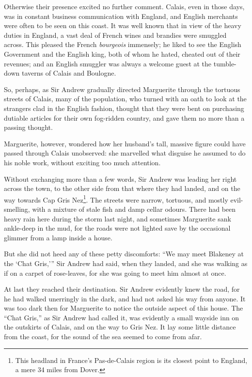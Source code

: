 \documentclass[paper=a5,BCOR=7mm,twoside,DIV=calc,12pt,usegeometry,chapterprefix,endperiod,headings=big]{scrbook}
\begin{document}
Otherwise their presence excited no further comment. Calais, even in those days, was in constant business communication with England, and English merchants were often to be seen on this coast. It was well known that in view of the heavy duties in England, a vast deal of French wines and brandies were smuggled across. This pleased the French \textit{bourgeois} immensely; he liked to see the English Government and the English king, both of whom he hated, cheated out of their revenues; and an English smuggler was always a welcome guest at the tumble-down taverns of Calais and Boulogne.

So, perhaps, as Sir Andrew gradually directed Marguerite through the tortuous streets of Calais, many of the population, who turned with an oath to look at the strangers clad in the English fashion, thought that they were bent on purchasing dutiable articles for their own fog-ridden country, and gave them no more than a passing thought.

Marguerite, however, wondered how her husband's tall, massive figure could have passed through Calais unobserved: she marvelled what disguise he assumed to do his noble work, without exciting too much attention.

Without exchanging more than a few words, Sir Andrew was leading her right across the town, to the other side from that where they had landed, and on the way towards Cap Gris Nez\footnote{This headland in France's Pas-de-Calais region is its closest point to England, a mere 34 miles from Dover.}. The streets were narrow, tortuous, and mostly evil-smelling, with a mixture of stale fish and damp cellar odours. There had been heavy rain here during the storm last night, and sometimes Marguerite sank ankle-deep in the mud, for the roads were not lighted save by the occasional glimmer from a lamp inside a house.

But she did not heed any of these petty discomforts: \enquote{We may meet Blakeney at the \enquote{Chat Gris,}} Sir Andrew had said, when they landed, and she was walking as if on a carpet of rose-leaves, for she was going to meet him almost at once.

At last they reached their destination. Sir Andrew evidently knew the road, for he had walked unerringly in the dark, and had not asked his way from anyone. It was too dark then for Marguerite to notice the outside aspect of this house. The \enquote{Chat Gris,} as Sir Andrew had called it, was evidently a small wayside inn on the outskirts of Calais, and on the way to Gris Nez. It lay some little distance from the coast, for the sound of the sea seemed to come from afar.
\end{document}
